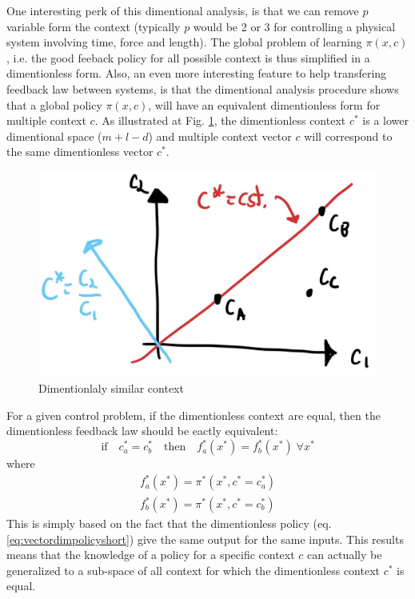 One interesting perk of this dimentional analysis, is that we can remove $p$ variable form the context (typically $p$ would be 2 or 3 for controlling a physical system involving time, force and length). The global problem of learning $\pi(x,c)$, i.e. the good feeback policy for all possible context is thus simplified in a dimentionless form. Also, an even more interesting feature to help transfering feedback law between systems, is that the dimentional analysis procedure shows that a global policy $\pi( x , c )$, will have an equivalent dimentionless form for multiple context $c$. As illustrated at Fig. \ref{fig:c_space}, the dimentionless context $c^*$ is a lower dimentional space ($m+l-d$) and multiple context vector $c$ will correspond to the same dimentionless vector $c^*$. 
\begin{figure}[ht]
\vspace{-5pt}
\begin{center}
\includegraphics[width=0.80\linewidth]{fig/c_space.jpg}
\caption{Dimentionlaly similar context}\label{fig:c_space}
\end{center}
\vspace{-15pt}
\end{figure}

For a given control problem, if the dimentionless context are equal, then the dimentionless feedback law should be eactly equivalent:
\begin{equation}
\text{if} \quad c_a^* = c_b^*  \quad \text{then} \quad f_a^*(x^*) = f_b^*(x^*) \; \forall x^*   
\end{equation}
where
\begin{align}
f_a^*(x^*) = \pi^*( x^* , c^* = c_a^*)\\
f_b^*(x^*) = \pi^*( x^* , c^* = c_b^*)
\end{align}
This is simply based on the fact that the dimentionless policy (eq. \eqref{eq:vectordimpolicyshort}) give the same output for the same inputs. This results means that the knowledge of a policy for a specific context $c$ can actually be generalized to a sub-space of all context for which the dimentionless context $c^*$ is equal.

